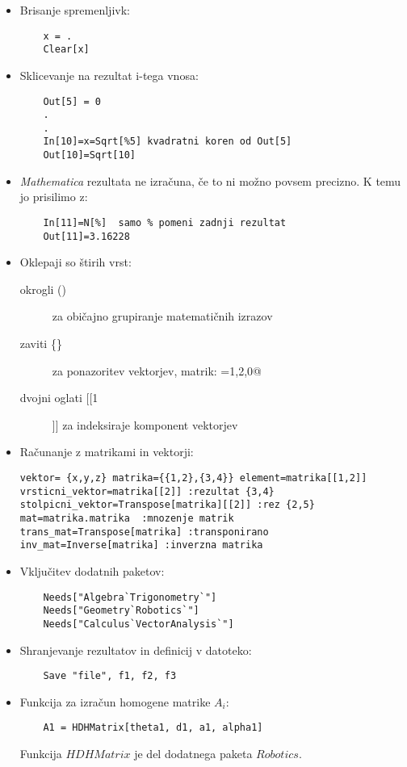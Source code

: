 \begin{itemize}
\item Brisanje spremenljivk:
\begin{verbatim}
    x = .
    Clear[x]
\end{verbatim}

\item Sklicevanje na rezultat i-tega vnosa:
\begin{verbatim}
    Out[5] = 0
    .
    .
    In[10]=x=Sqrt[%5] kvadratni koren od Out[5]
    Out[10]=Sqrt[10]
\end{verbatim}


\item \emph{Mathematica} rezultata ne izračuna, če to ni možno povsem precizno. K temu jo prisilimo z:
\begin{verbatim}
    In[11]=N[%]  samo % pomeni zadnji rezultat
    Out[11]=3.16228
\end{verbatim}

\item Oklepaji so štirih vrst:
\begin{description}
  \item[okrogli ()] za običajno grupiranje matematičnih izrazov
  \item[zaviti \{\}] za ponazoritev vektorjev, matrik: ={1,2,0}@
  \item[dvojni oglati [[1]]] za indeksiraje komponent vektorjev
\end{description}

\item Računanje z matrikami in vektorji:
\begin{verbatim}
vektor= {x,y,z} matrika={{1,2},{3,4}} element=matrika[[1,2]]
vrsticni_vektor=matrika[[2]] :rezultat {3,4}
stolpicni_vektor=Transpose[matrika][[2]] :rez {2,5}
mat=matrika.matrika  :mnozenje matrik
trans_mat=Transpose[matrika] :transponirano
inv_mat=Inverse[matrika] :inverzna matrika
\end{verbatim}

\item Vključitev dodatnih paketov:
\begin{verbatim}
    Needs["Algebra`Trigonometry`"]
    Needs["Geometry`Robotics`"]
    Needs["Calculus`VectorAnalysis`"]
\end{verbatim}


\item Shranjevanje rezultatov in definicij v datoteko:
\begin{verbatim}
    Save "file", f1, f2, f3
\end{verbatim}

\item Funkcija za izračun homogene matrike $A_i$:
\begin{verbatim}
    A1 = HDHMatrix[theta1, d1, a1, alpha1]
\end{verbatim}
Funkcija $HDHMatrix$ je del dodatnega paketa $Robotics$.

\end{itemize}

